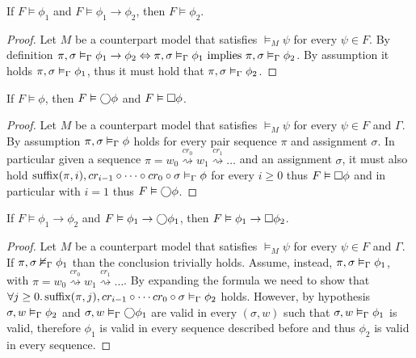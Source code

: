 \begin{lemma}\label{lem:mp}
  If $F \vDash \phi_1$ and $F \vDash \phi_1 \to \phi_2$, then $F \vDash \phi_2$.
\end{lemma}
\begin{proof}
  Let $M$ be a counterpart model that satisfies $\vDash_M \psi$ for every $\psi \in F$.
  By definition ${\pi}, {\sigma} \vDash_{\Gamma} {\phi_1 \to \phi_2} \Leftrightarrow {\pi}, {\sigma} \vDash_{\Gamma} {\phi_1}
  \text{ implies } {\pi}, {\sigma} \vDash_{\Gamma} {\phi_2}$. By assumption it holds ${\pi}, {\sigma} \vDash_{\Gamma} {\phi_1}$, thus it must
  hold that ${\pi}, {\sigma} \vDash_{\Gamma} {\phi_2}$.
\end{proof}
\begin{lemma}\label{lem:nex}
  If $F \vDash \phi$, then $F \vDash \bigcirc{\phi}$ and $F \vDash \Box{\phi}$.
\end{lemma}
\begin{proof}
  Let $M$ be a counterpart model that satisfies $\vDash_M \psi$ for every $\psi \in F$ and $\Gamma$.
  By assumption ${\pi}, {\sigma} \vDash_{\Gamma} {\phi}$ holds for every pair sequence $\pi$ and assignment $\sigma$.
  In particular given a sequence $\pi = w_0 \overset{cr_0}{\rightsquigarrow} w_1 \overset{cr_1}{\rightsquigarrow}
  \ldots$ and an assignment $\sigma$, it must also hold ${\operatorname{suffix}(\pi,i)}, {cr_{i-1} \circ \cdots \circ cr_0 \circ
  \sigma} \vDash_{\Gamma} {\phi}$ for every $i \geq 0$ thus $F \vDash \Box{\phi}$ and in particular with $i = 1$ thus $F
  \vDash \bigcirc{\phi}$.
\end{proof}
\begin{lemma}\label{lem:ind}
  If $F \vDash \phi_1 \to \phi_2$ and $F \vDash \phi_1 \to \bigcirc{\phi_1}$, then $F \vDash \phi_1 \to \Box{\phi_2}$.
\end{lemma}
\begin{proof}
  Let $M$ be a counterpart model that satisfies $\vDash_M \psi$ for every $\psi \in F$ and $\Gamma$.  If
  ${\pi}, {\sigma} \nvDash_{\Gamma} {\phi_1}$ than the conclusion trivially holds. Assume, instead,
  ${\pi}, {\sigma} \vDash_{\Gamma} {\phi_1}$, with $\pi = w_0 \overset{cr_0}{\rightsquigarrow} w_1
  \overset{cr_1}{\rightsquigarrow} \ldots$.
  By expanding the formula we need to show that $\forall {j \geq 0} \ldotp {{\operatorname{suffix}(\pi, j)}, {cr_{i - 1} \circ \cdots cr_0 \circ
  \sigma} \vDash_{\Gamma} {\phi_2}}$ holds.
  However, by hypothesis ${\sigma}, {w} \vDash_{\Gamma} {\phi_2}$ and
  ${\sigma}, {w} \vDash_{\Gamma} {\bigcirc{\phi_1}}$ are valid in every $(\sigma, w)$ such that
  ${\sigma}, {w} \vDash_{\Gamma} {\phi_1}$ is valid, therefore $\phi_1$ is valid in every sequence described before and thus
  $\phi_2$ is valid in every sequence.
\end{proof}
